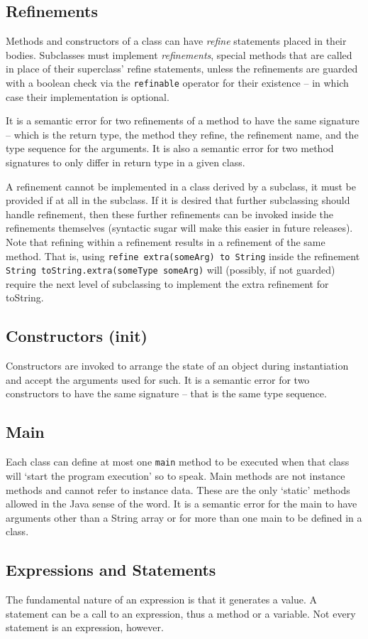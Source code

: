 \subsection{Refinements}
Methods and constructors of a class can have \textit{refine} statements placed in their bodies. Subclasses must implement \textit{refinements}, special methods that are called in place of their superclass' refine statements, unless the refinements are guarded with a boolean check via the \verb!refinable! operator for their existence -- in which case their implementation is optional.

It is a semantic error for two refinements of a method to have the same signature -- which is the return type, the method they refine, the refinement name, and the type sequence for the arguments. It is also a semantic error for two method signatures to only differ in return type in a given class.

A refinement cannot be implemented in a class derived by a subclass, it must be provided if at all in the subclass. If it is desired that further subclassing should handle refinement, then these further refinements can be invoked inside the refinements themselves (syntactic sugar will make this easier in future releases). Note that refining within a refinement results in a refinement of the same method. That is, using \verb!refine extra(someArg) to String! inside the refinement \verb!String toString.extra(someType someArg)! will (possibly, if not guarded) require the next level of subclassing to implement the extra refinement for toString.

\subsection{Constructors (init)}
Constructors are invoked to arrange the state of an object during instantiation and accept the arguments used for such. It is a semantic error for two constructors to have the same signature -- that is the same type sequence.

\subsection{Main}
Each class can define at most one \verb!main! method to be executed when that class will `start the program execution' so to speak. Main methods are not instance methods and cannot refer to instance data. These are the only `static' methods allowed in the Java sense of the word. It is a semantic error for the main to have arguments other than a String array or for more than one main to be defined in a class.

\subsection{Expressions and Statements}
The fundamental nature of an expression is that it generates a value. A statement can be a call to an expression, thus a method or a variable. Not every statement is an expression, however.
